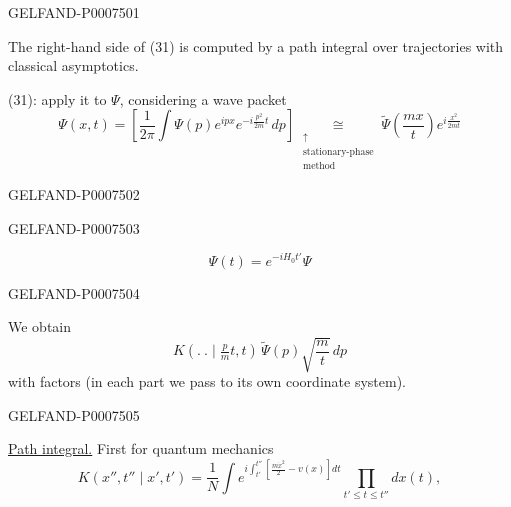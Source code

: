 \begin{GelfandAdjacentEvidence}{GELFAND-P000750}{1}

The right-hand side of (31) is computed by a path integral over trajectories with classical asymptotics.

 (31): apply it to \(\Psi\), considering a wave packet
\begin{equation*}
\Psi(x,t)=\left[\frac1{2\pi}\int\Psi(p)e^{ipx}e^{-i\frac{p^2}{2m}t}\,dp\right]
\underset{\substack{\uparrow\\\text{stationary-phase}\\\text{method}}}{\cong}
\widetilde\Psi\left(\frac{mx}{t}\right)e^{i\frac{x^2}{2mt}}
\tag{32}
\end{equation*}
\end{GelfandAdjacentEvidence}
\begin{GelfandAdjacentEvidence}{GELFAND-P000750}{2}

\end{GelfandAdjacentEvidence}
\begin{GelfandAdjacentEvidence}{GELFAND-P000750}{3}

\[
\Psi(t)=e^{-iH_0t'}\Psi
\]
\end{GelfandAdjacentEvidence}
\begin{GelfandAdjacentEvidence}{GELFAND-P000750}{4}

We obtain
\begin{equation*}
K(.\ .\mid\tfrac{p}{m}t,t)\,\widetilde\Psi(p)\sqrt{\frac mt}\,dp
\tag{33}
\end{equation*}
with factors (in each part we pass to its own coordinate system).
\end{GelfandAdjacentEvidence}
\begin{GelfandAdjacentEvidence}{GELFAND-P000750}{5}


\underline{Path integral.} First for quantum mechanics
\begin{equation*}
K(x'',t''\mid x',t')=\frac1N\int
e^{i\int_{t'}^{t''}\left[\frac{m\dot x^2}{2}-v(x)\right]dt}
\prod_{t'\leq t\leq t''}dx(t),
\tag{34}
\end{equation*}
\end{GelfandAdjacentEvidence}
